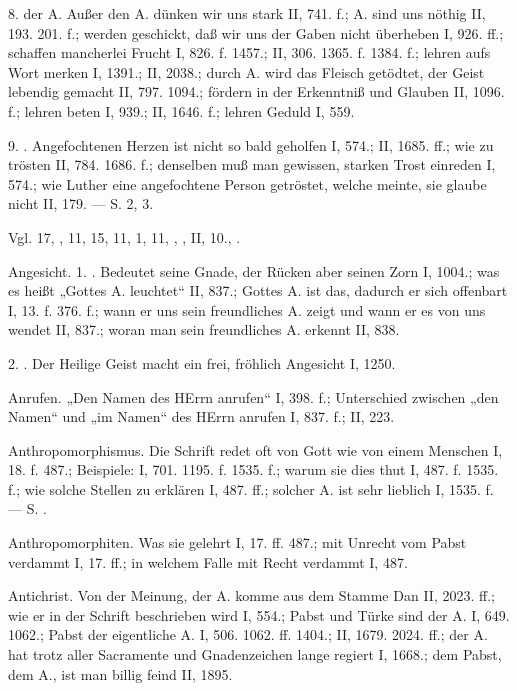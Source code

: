 8.  der A. Außer den A. dünken wir uns stark II, 741. f.; A. sind uns nöthig II, 193. 201. f.; werden geschickt, daß wir uns der Gaben nicht überheben I, 926. ff.; schaffen mancherlei Frucht I, 826. f. 1457.; II, 306. 1365. f. 1384. f.; lehren aufs Wort merken I, 1391.; II, 2038.; durch A. wird das Fleisch getödtet, der Geist lebendig gemacht II, 797. 1094.; fördern in der Erkenntniß und Glauben II, 1096. f.; lehren beten I, 939.; II, 1646. f.; lehren Geduld I, 559.

9. . Angefochtenen Herzen ist nicht so bald geholfen I, 574.; II, 1685. ff.; wie zu trösten II, 784. 1686. f.; denselben muß man gewissen, starken Trost einreden I, 574.; wie Luther eine angefochtene Person getröstet, welche meinte, sie glaube nicht II, 179. — S.  2, 3.

Vgl.  17, ,  11,  15,  11,  1,  11, , ,  II, 10., .

Angesicht. 1. . Bedeutet seine Gnade, der Rücken aber seinen Zorn I, 1004.; was es heißt „Gottes A. leuchtet“ II, 837.; Gottes A. ist das, dadurch er sich offenbart I, 13. f. 376. f.; wann er uns sein freundliches A. zeigt und wann er es von uns wendet II, 837.; woran man sein freundliches A. erkennt II, 838.

2. . Der Heilige Geist macht ein frei, fröhlich Angesicht I, 1250.

Anrufen. „Den Namen des HErrn anrufen“ I, 398. f.; Unterschied zwischen „den Namen“ und „im Namen“ des HErrn anrufen I, 837. f.; II, 223.

Anthropomorphismus. Die Schrift redet oft von Gott wie von einem Menschen I, 18. f. 487.; Beispiele: I, 701. 1195. f. 1535. f.; warum sie dies thut I, 487. f. 1535. f.; wie solche Stellen zu erklären I, 487. ff.; solcher A. ist sehr lieblich I, 1535. f. — S. .

Anthropomorphiten. Was sie gelehrt I, 17. ff. 487.; mit Unrecht vom Pabst verdammt I, 17. ff.; in welchem Falle mit Recht verdammt I, 487.

Antichrist. Von der Meinung, der A. komme aus dem Stamme Dan II, 2023. ff.; wie er in der Schrift beschrieben wird I, 554.; Pabst und Türke sind der A. I, 649. 1062.; Pabst der eigentliche A. I, 506. 1062. ff. 1404.; II, 1679. 2024. ff.; der A. hat trotz aller Sacramente und Gnadenzeichen lange regiert I, 1668.; dem Pabst, dem A., ist man billig feind II, 1895.

